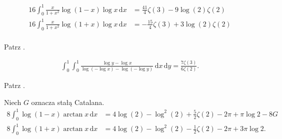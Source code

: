 
\begin{problem_with_solution}
    \label{valean_1_14}%
    \begin{align}
        16 \int_0^1 \frac{x}{1+ x^2} \log (1 - x) \log x \,\mathrm{d}x & = \frac{41}{4} \zeta(3) - 9 \log(2) \zeta(2) \\
        16 \int_0^1 \frac{x}{1+ x^2} \log (1 + x) \log x \,\mathrm{d}x & = -\frac{15}{4} \zeta(3) + 3 \log(2) \zeta(2) \\
    \end{align} 
\end{problem_with_solution}


\begin{solution}
    Patrz \cite[s. 8]{valean19}.
\end{solution}


\begin{problem_with_solution}
    \label{valean_1_17}%
    \begin{align}
        \int_0^1 \int_0^1 \frac{\log y - \log x}{\log (- \log x) - \log(- \log y)} \,\mathrm{d}x \,\mathrm{d}y = \frac{7 \zeta(3)}{6 \zeta (2)}.
    \end{align} 
\end{problem_with_solution}


\begin{solution}
    Patrz \cite[s. 10]{valean19}.
\end{solution}


\begin{problem_with_solution}
    \label{valean_1_18}%
    Niech $G$ oznacza stałą Catalana.
    \begin{align}
        8 \int_0^1 \log (1 - x) \arctan x \,\mathrm{d}x & = 4 \log (2) - \log^2 (2) + \frac 5 2 \zeta(2) - 2 \pi + \pi \log 2 - 8 G \\
        8 \int_0^1 \log (1 + x) \arctan x \,\mathrm{d}x & = 4 \log (2) - \log^2 (2) - \frac 1 2 \zeta(2) - 2 \pi + 3 \pi \log 2.
    \end{align} 
\end{problem_with_solution}

